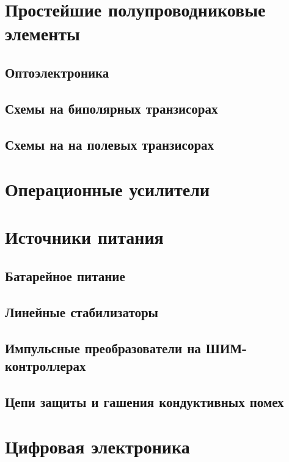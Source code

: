 \chapter{Простейшие полупроводниковые элементы}

\section{Оптоэлектроника}

\section{Схемы на биполярных транзисорах} 

\section{Схемы на на полевых транзисорах}

\chapter{Операционные усилители}

\chapter{Источники питания}

\section{Батарейное питание}

\section{Линейные стабилизаторы}

\section{Импульсные преобразователи на ШИМ-контроллерах} 

\section{Цепи защиты и гашения кондуктивных помех}

\chapter{Цифровая электроника}

